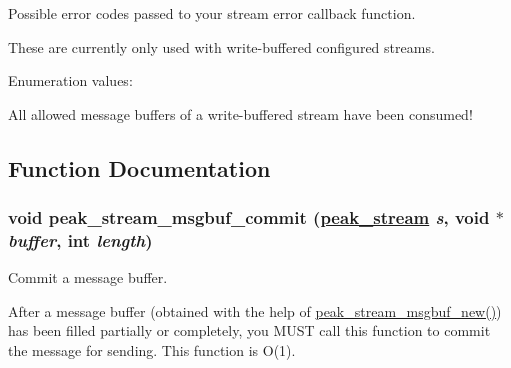 Possible error codes passed to your stream error callback function. 

These are currently only used with write-buffered configured streams. \begin{Desc}
\item[Enumeration values: ]\par
\begin{description}
\item[{\em 
\hypertarget{group__stream__buf_gga8a18}{
PEAK\_\-STREAM\_\-ERR\_\-MAX\_\-MSGBUF\_\-EXCEEDED}
\label{group__stream__buf_gga8a18}
}]All allowed message buffers of a write-buffered stream have been consumed! \end{description}
\end{Desc}



\subsection{Function Documentation}
\hypertarget{group__stream__buf_ga5}{
\subsubsection[peak\_\-stream\_\-msgbuf\_\-commit]{\setlength{\rightskip}{0pt plus 5cm}void peak\_\-stream\_\-msgbuf\_\-commit (\hyperlink{group__stream_ga0}{peak\_\-stream} {\em s}, void $\ast$ {\em buffer}, int {\em length})}}
\label{group__stream__buf_ga5}


Commit a message buffer. 

After a message buffer (obtained with the help of \hyperlink{group__stream__buf_ga57}{peak\_\-stream\_\-msgbuf\_\-new()}) has been filled partially or completely, you MUST call this function to commit the message for sending. This function is O(1).

